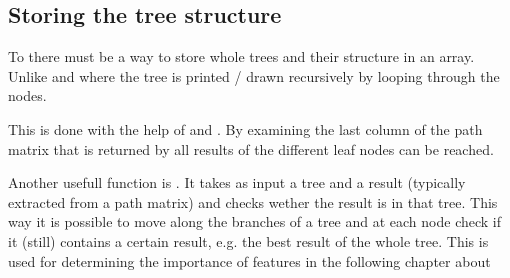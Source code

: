 \documentclass[letterpaper,10pt,english]{sphinxmanual}
\begin{document}
\subsection{Storing the tree structure}
\label{\detokenize{DT:storing-the-tree-structure}}
To {\hyperref[\detokenize{RF:random-forest}]{}} there must be a way to store whole trees and their structure in an array.
Unlike {\hyperref[\detokenize{DT:printtree}]{}} and {\hyperref[\detokenize{DT:drawtree}]{}} where the tree is printed / drawn recursively by looping through the nodes.

This is done with the help of {\hyperref[\detokenize{DT:pathgen}]{}} and {\hyperref[\detokenize{DT:pathgen2}]{}}.
By examining the last column of the path matrix that is returned by {\hyperref[\detokenize{DT:pathgen}]{}} all results of the different leaf nodes can be reached.

Another usefull function is {\hyperref[\detokenize{DT:checkpath}]{}}. It takes as input a tree and a result (typically extracted from a path matrix) and checks wether the result is in that tree. This way it is possible to move along the branches of a tree and at each node check if it (still) contains a certain result, e.g. the best result of the whole tree. This is used for determining the importance of features in the following chapter about {\hyperref[\detokenize{RF:random-forest}]{}}
\end{document}
